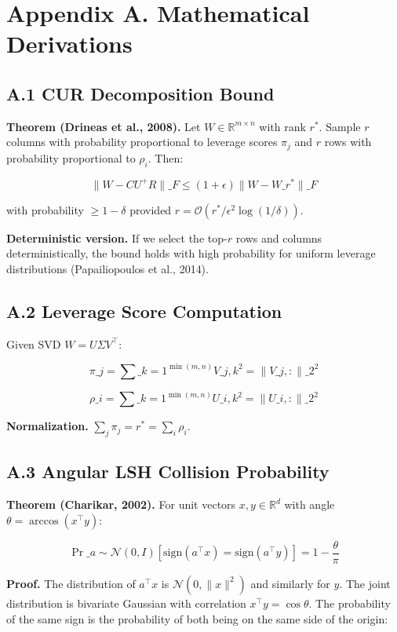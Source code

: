 
\section{Appendix A. Mathematical Derivations}

\subsection{A.1 CUR Decomposition Bound}

\textbf{Theorem (Drineas et al., 2008).} Let $W \in \mathbb{R}^{m \times n}$ with 
rank $r^*$. Sample $r$ columns with probability proportional to leverage 
scores $\pi_j$ and $r$ rows with probability proportional to $\rho_i$. Then:

\[
\|W - C U^+ R\|\_F \leq (1 + \epsilon) \|W - W\_{r^*}\|\_F
\tag{A.1}
\]

with probability $\geq 1 - \delta$ provided $r = \mathcal{O}(r^* / \epsilon^2 \log(1/\delta))$.

\textbf{Deterministic version.} If we select the top-$r$ rows and columns 
deterministically, the bound holds with high probability for uniform 
leverage distributions (Papailiopoulos et al., 2014).

\subsection{A.2 Leverage Score Computation}

Given SVD $W = U \Sigma V^\top$:

\[
\pi\_j = \sum\_{k=1}^{\min(m, n)} V\_{j, k}^2 = \|V\_{j, :}\|\_2^2
\tag{A.2}
\]

\[
\rho\_i = \sum\_{k=1}^{\min(m, n)} U\_{i, k}^2 = \|U\_{i, :}\|\_2^2
\tag{A.3}
\]

\textbf{Normalization.} $\sum_j \pi_j = r^* = \sum_i \rho_i$.

\subsection{A.3 Angular LSH Collision Probability}

\textbf{Theorem (Charikar, 2002).} For unit vectors $x, y \in \mathbb{R}^d$ with 
angle $\theta = \arccos(x^\top y)$:

\[
\Pr\_{a \sim \mathcal{N}(0, I)}[\text{sign}(a^\top x) = \text{sign}(a^\top y)] = 1 - \frac{\theta}{\pi}
\tag{A.4}
\]

\textbf{Proof.} The distribution of $a^\top x$ is $\mathcal{N}(0, \|x\|^2)$ and 
similarly for $y$. The joint distribution is bivariate Gaussian with 
correlation $x^\top y = \cos \theta$. The probability of the same sign is 
the probability of both being on the same side of the origin:

